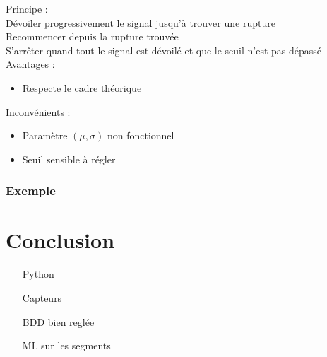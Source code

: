 \documentclass{beamer}
\begin{document}
\begin{frame}

	Principe :
	\vspace{.25cm}
	\\
	Dévoiler progressivement le signal jusqu'à trouver une rupture
	\\
	Recommencer depuis la rupture trouvée
	\\
	S'arrêter quand tout le signal est dévoilé et que le seuil n'est pas dépassé
	\\
	\phantom{caca}
	Avantages :
	
	\begin{itemize}
	
		\item Respecte le cadre théorique
		
	\end{itemize}
	
	Inconvénients :
	
	\begin{itemize}
	
		\item Paramètre $(\mu,\sigma)$ non fonctionnel
		
		\item Seuil sensible à régler
		
	\end{itemize}
	
\end{frame}

\begin{frame}
\frametitle{Exemple}
\end{frame}

\section{Conclusion}

\begin{frame}

\begin{itemize}

	\item[Python]
	
	\item[Capteurs]
	
	\item[BDD] bien reglée
	
	\item[ML] sur les segments

\end{itemize}

\end{frame}
\end{document}
